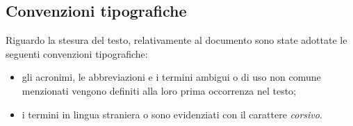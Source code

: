 \subsection{Convenzioni tipografiche}

Riguardo la stesura del testo, relativamente al documento sono state adottate le seguenti convenzioni tipografiche:
\begin{itemize}
	\item gli acronimi, le abbreviazioni e i termini ambigui o di uso non comune menzionati vengono definiti alla loro prima occorrenza nel testo;
	\item i termini in lingua straniera o sono evidenziati con il carattere \textit{corsivo}.
\end{itemize}


\newpage
